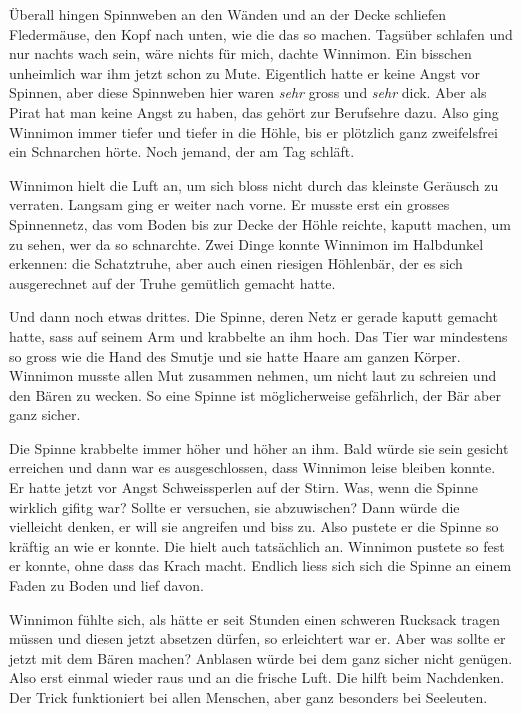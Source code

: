 Überall hingen Spinnweben an den Wänden und an der Decke schliefen Fledermäuse, den Kopf nach unten, wie die das so machen. Tagsüber schlafen und nur nachts wach sein, wäre nichts für mich, dachte Winnimon. Ein bisschen unheimlich war ihm jetzt schon zu Mute. Eigentlich hatte er keine Angst vor Spinnen, aber diese Spinnweben hier waren {\it sehr} gross und {\it sehr} dick. Aber als Pirat hat man keine Angst zu haben, das gehört zur Berufsehre dazu. Also ging Winnimon immer tiefer und tiefer in die Höhle, bis er plötzlich ganz zweifelsfrei ein Schnarchen hörte. Noch jemand, der am Tag schläft.

Winnimon hielt die Luft an, um sich bloss nicht durch das kleinste Geräusch zu verraten. Langsam ging er weiter nach vorne. Er musste erst ein grosses Spinnennetz, das vom Boden bis zur Decke der Höhle reichte, kaputt machen, um zu sehen, wer da so schnarchte. Zwei Dinge konnte Winnimon im Halbdunkel erkennen: die Schatztruhe, aber auch einen riesigen Höhlenbär, der es sich ausgerechnet auf der Truhe gemütlich gemacht hatte.

Und dann noch etwas drittes. Die Spinne, deren Netz er gerade kaputt gemacht hatte, sass auf seinem Arm und krabbelte an ihm hoch. Das Tier war mindestens so gross wie die Hand des Smutje und sie hatte Haare am ganzen Körper. Winnimon musste allen Mut zusammen nehmen, um nicht laut zu schreien und den Bären zu wecken. So eine Spinne ist möglicherweise gefährlich, der Bär aber ganz sicher.

Die Spinne krabbelte immer höher und höher an ihm. Bald würde sie sein gesicht erreichen und dann war es ausgeschlossen, dass Winnimon leise bleiben konnte. Er hatte jetzt vor Angst Schweissperlen auf der Stirn. Was, wenn die Spinne wirklich gifitg war? Sollte er versuchen, sie abzuwischen? Dann würde die vielleicht denken, er will sie angreifen und biss zu. Also pustete er die Spinne so kräftig an wie er konnte. Die hielt auch tatsächlich an. Winnimon pustete so fest er konnte, ohne dass das Krach macht. Endlich liess sich sich die Spinne an einem Faden zu Boden und lief davon.

Winnimon fühlte sich, als hätte er seit Stunden einen schweren Rucksack tragen müssen und diesen jetzt absetzen dürfen, so erleichtert war er. Aber was sollte er jetzt mit dem Bären machen? Anblasen würde bei dem ganz sicher nicht genügen. Also erst einmal wieder raus und an die frische Luft. Die hilft beim Nachdenken. Der Trick funktioniert bei allen Menschen, aber ganz besonders bei Seeleuten.

